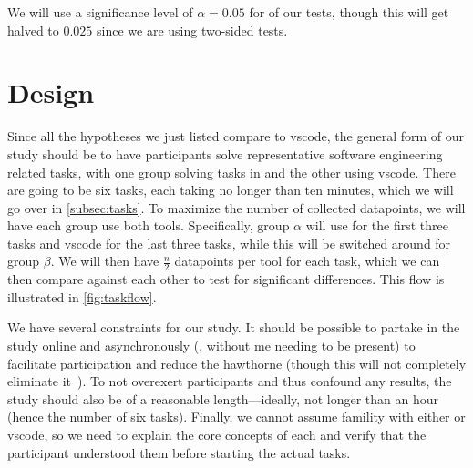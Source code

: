 \documentclass[../thesis]{subfiles}
\begin{document}
We will use a significance level of $\alpha = 0.05$ for  of our tests, though this will get halved to $0.025$ since we are using two-sided tests.

\section{Design}\label{sec:design}
Since all the hypotheses we just listed compare \SEE{} to \gls{vscode}, the general form of our study should be to have participants solve representative software engineering related tasks, with one group solving tasks in \SEE{} and the other using \gls{vscode}.
There are going to be six tasks, each taking no longer than ten minutes, which we will go over in \cref{subsec:tasks}.
To maximize the number of collected datapoints, we will have each group use both tools.
Specifically, group $\alpha$ will use \SEE{} for the first three tasks and \gls{vscode} for the last three tasks, while this will be switched around for group $\beta$.
We will then have $\frac{n}{2}$ datapoints per tool for each task, which we can then compare against each other to test for significant differences.
This flow is illustrated in \cref{fig:taskflow}.

We have several constraints for our study.
It should be possible to partake in the study online and asynchronously (\ie, without me needing to be present) to facilitate participation and reduce the \gls{hawthorne} (though this will not completely eliminate it~\cite[\eg][]{evans2010}).
To not overexert participants and thus confound any results, the study should also be of a reasonable length---ideally, not longer than an hour (hence the number of six tasks).
Finally, we cannot assume famility with either \SEE{} or \gls{vscode}, so we need to explain the core concepts of each and verify that the participant understood them before starting the actual tasks.
\end{document}
